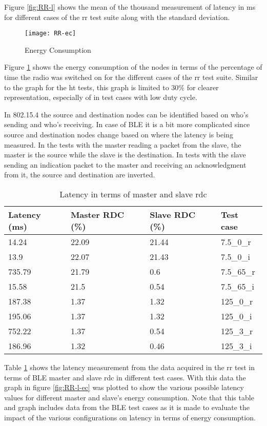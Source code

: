 Figure \ref{fig:RR-l} shows the mean of the thousand measurement of latency in ms for different cases of the \gls{rr} test suite along with the standard deviation. 

\begin{figure}[h]
\texttt{[image: RR-ec]}
\caption{Energy Consumption}
\label{fig:RR-ec}
\end{figure}

Figure \ref{fig:RR-ec} shows the energy consumption of the nodes in terms of the percentage of time the radio was switched on for the different cases of the \gls{rr} test suite. Similar to the graph for the \gls{ht} tests, this graph is limited to 30\% for clearer representation, especially of in test cases with low duty cycle.

In 802.15.4 the source and destination nodes can be identified based on who's sending and who's receiving. In case of BLE it is a bit more complicated since source and destination nodes change based on where the latency is being measured. In the tests with the master reading a packet from the slave, the master is the source while the slave is the destination. In tests with the slave sending an indication packet to the master and receiving an acknowledgment from it, the source and destination are inverted.

\begin{table}[h]
\centering
\begin{tabular}[c]{|l|l|l|l|}
\hline
Latency (ms) & Master RDC (\%) & Slave RDC (\%) & Test case \\ \hline
14.24 & 22.09 & 21.44 & 7.5\_0\_r \\ \hline
13.9 & 22.07 & 21.43 & 7.5\_0\_i \\ \hline
735.79 & 21.79 & 0.6 & 7.5\_65\_r \\ \hline
15.58 & 21.5 & 0.54 & 7.5\_65\_i \\ \hline
187.38 & 1.37 & 1.32 & 125\_0\_r \\ \hline
195.06 & 1.37 & 1.32 & 125\_0\_i \\ \hline
752.22 & 1.37 & 0.54 & 125\_3\_r \\ \hline
186.96 & 1.32 & 0.46 & 125\_3\_i \\ \hline
\end{tabular}
\caption{Latency in terms of master and slave \gls{rdc}}
\label{tbl:latVsEnergy}
\end{table}

Table \ref{tbl:latVsEnergy} shows the latency measurement from the data acquired in the \gls{rr} test in terms of BLE master and slave \gls{rdc} in different test cases. With this data the graph in figure \ref{fig:RR-l-ec} was plotted to show the various possible latency values for different master and slave's energy consumption. Note that this table and graph includes data from the BLE test cases as it is made to evaluate the impact of the various configurations on latency in terms of energy consumption.

